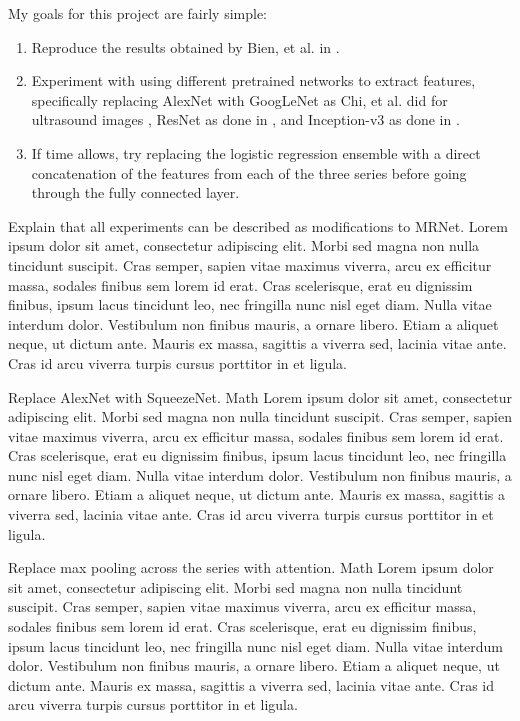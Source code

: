 \documentclass[10pt,twocolumn,letterpaper]{article}
\begin{document}
My goals for this project are fairly simple:
\begin{enumerate}
   \item Reproduce the results obtained by Bien, et al. in \cite{bien2018deep}.
   \item Experiment with using different pretrained networks to extract features,
   specifically replacing AlexNet with GoogLeNet \cite{szegedy2015going} as Chi, et al. did for ultrasound images \cite{chi2017thyroid}, ResNet \cite{he2016deep} as done in \cite{korfiatis2017residual}, and Inception-v3 \cite{szegedy2016rethinking} as done in \cite{kim2018artificial}.
   \item If time allows, try replacing the logistic regression ensemble with a direct concatenation of the features from each of the three series before going through the fully connected layer.
\end{enumerate}

Explain that all experiments can be described as modifications to MRNet.
Lorem ipsum dolor sit amet, consectetur adipiscing elit. Morbi sed magna non nulla tincidunt suscipit. Cras semper, sapien vitae maximus viverra, arcu ex efficitur massa, sodales finibus sem lorem id erat. Cras scelerisque, erat eu dignissim finibus, ipsum lacus tincidunt leo, nec fringilla nunc nisl eget diam. Nulla vitae interdum dolor. Vestibulum non finibus mauris, a ornare libero. Etiam a aliquet neque, ut dictum ante. Mauris ex massa, sagittis a viverra sed, lacinia vitae ante. Cras id arcu viverra turpis cursus porttitor in et ligula.

Replace AlexNet with SqueezeNet. Math
Lorem ipsum dolor sit amet, consectetur adipiscing elit. Morbi sed magna non nulla tincidunt suscipit. Cras semper, sapien vitae maximus viverra, arcu ex efficitur massa, sodales finibus sem lorem id erat. Cras scelerisque, erat eu dignissim finibus, ipsum lacus tincidunt leo, nec fringilla nunc nisl eget diam. Nulla vitae interdum dolor. Vestibulum non finibus mauris, a ornare libero. Etiam a aliquet neque, ut dictum ante. Mauris ex massa, sagittis a viverra sed, lacinia vitae ante. Cras id arcu viverra turpis cursus porttitor in et ligula.

Replace max pooling across the series with attention. Math
Lorem ipsum dolor sit amet, consectetur adipiscing elit. Morbi sed magna non nulla tincidunt suscipit. Cras semper, sapien vitae maximus viverra, arcu ex efficitur massa, sodales finibus sem lorem id erat. Cras scelerisque, erat eu dignissim finibus, ipsum lacus tincidunt leo, nec fringilla nunc nisl eget diam. Nulla vitae interdum dolor. Vestibulum non finibus mauris, a ornare libero. Etiam a aliquet neque, ut dictum ante. Mauris ex massa, sagittis a viverra sed, lacinia vitae ante. Cras id arcu viverra turpis cursus porttitor in et ligula.
\end{document}
